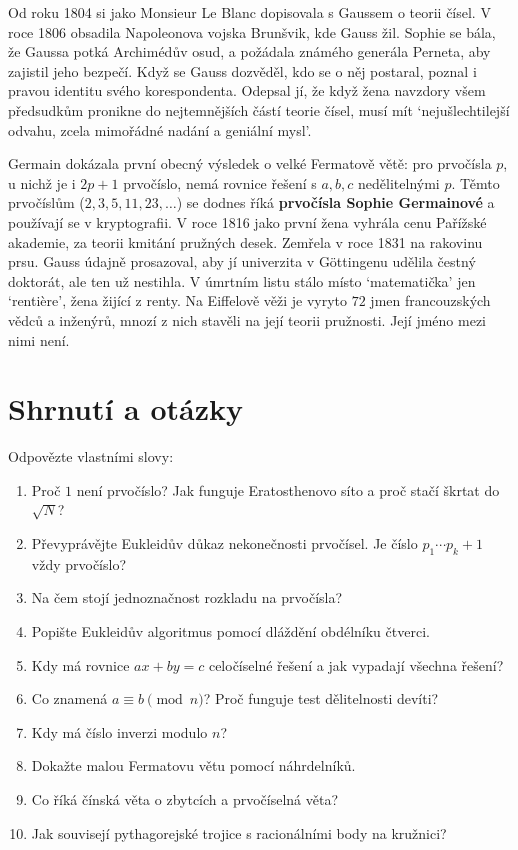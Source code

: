 Od roku 1804 si jako Monsieur Le Blanc dopisovala s Gaussem o teorii čísel. V roce 1806 obsadila Napoleonova vojska Brunšvik, kde Gauss žil. Sophie se bála, že Gaussa potká Archimédův osud, a požádala známého generála Perneta, aby zajistil jeho bezpečí. Když se Gauss dozvěděl, kdo se o něj postaral, poznal i pravou identitu svého korespondenta. Odepsal jí, že když žena navzdory všem předsudkům pronikne do nejtemnějších částí teorie čísel, musí mít `nejušlechtilejší odvahu, zcela mimořádné nadání a geniální mysl'.

Germain dokázala první obecný výsledek o velké Fermatově větě: pro prvočísla $p$, u nichž je i $2p + 1$ prvočíslo, nemá rovnice řešení s $a, b, c$ nedělitelnými $p$. Těmto prvočíslům ($2, 3, 5, 11, 23, \ldots$) se dodnes říká \textbf{prvočísla Sophie Germainové} a používají se v kryptografii. V roce 1816 jako první žena vyhrála cenu Pařížské akademie, za teorii kmitání pružných desek. Zemřela v roce 1831 na rakovinu prsu. Gauss údajně prosazoval, aby jí univerzita v Göttingenu udělila čestný doktorát, ale ten už nestihla. V úmrtním listu stálo místo `matematička' jen `rentière', žena žijící z renty. Na Eiffelově věži je vyryto $72$ jmen francouzských vědců a inženýrů, mnozí z nich stavěli na její teorii pružnosti. Její jméno mezi nimi není.

\section{Shrnutí a otázky}

\begin{problem}
  Odpovězte vlastními slovy:
  \begin{enumerate}
    \item Proč $1$ není prvočíslo? Jak funguje Eratosthenovo síto a proč stačí škrtat do $\sqrt{N}$?
    \item Převyprávějte Eukleidův důkaz nekonečnosti prvočísel. Je číslo $p_1\cdots p_k + 1$ vždy prvočíslo?
    \item Na čem stojí jednoznačnost rozkladu na prvočísla?
    \item Popište Eukleidův algoritmus pomocí dláždění obdélníku čtverci.
    \item Kdy má rovnice $ax + by = c$ celočíselné řešení a jak vypadají všechna řešení?
    \item Co znamená $a\equiv b\pmod n$? Proč funguje test dělitelnosti devíti?
    \item Kdy má číslo inverzi modulo $n$?
    \item Dokažte malou Fermatovu větu pomocí náhrdelníků.
    \item Co říká čínská věta o zbytcích a prvočíselná věta?
    \item Jak souvisejí pythagorejské trojice s racionálními body na kružnici?
  \end{enumerate}
\end{problem}

